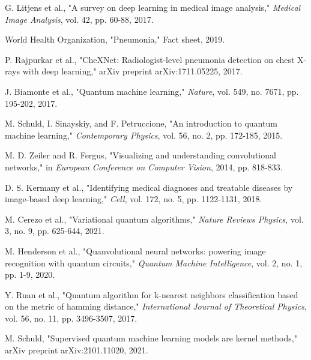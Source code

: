 \documentclass[conference]{IEEEtran}
\begin{document}
\begin{thebibliography}{00}
 G. Litjens et al., "A survey on deep learning in medical image analysis," \textit{Medical Image Analysis}, vol. 42, pp. 60-88, 2017.

 World Health Organization, "Pneumonia," Fact sheet, 2019.

 P. Rajpurkar et al., "CheXNet: Radiologist-level pneumonia detection on chest X-rays with deep learning," arXiv preprint arXiv:1711.05225, 2017.

 J. Biamonte et al., "Quantum machine learning," \textit{Nature}, vol. 549, no. 7671, pp. 195-202, 2017.

 M. Schuld, I. Sinayskiy, and F. Petruccione, "An introduction to quantum machine learning," \textit{Contemporary Physics}, vol. 56, no. 2, pp. 172-185, 2015.

 M. D. Zeiler and R. Fergus, "Visualizing and understanding convolutional networks," in \textit{European Conference on Computer Vision}, 2014, pp. 818-833.

 D. S. Kermany et al., "Identifying medical diagnoses and treatable diseases by image-based deep learning," \textit{Cell}, vol. 172, no. 5, pp. 1122-1131, 2018.

 M. Cerezo et al., "Variational quantum algorithms," \textit{Nature Reviews Physics}, vol. 3, no. 9, pp. 625-644, 2021.

 M. Henderson et al., "Quanvolutional neural networks: powering image recognition with quantum circuits," \textit{Quantum Machine Intelligence}, vol. 2, no. 1, pp. 1-9, 2020.

 Y. Ruan et al., "Quantum algorithm for k-nearest neighbors classification based on the metric of hamming distance," \textit{International Journal of Theoretical Physics}, vol. 56, no. 11, pp. 3496-3507, 2017.

 M. Schuld, "Supervised quantum machine learning models are kernel methods," arXiv preprint arXiv:2101.11020, 2021.

\end{thebibliography}
\end{document}
